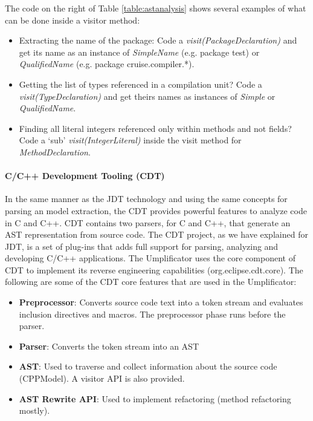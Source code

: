 The code on the right of Table \ref{table:astanalysis} shows several examples of what can be done inside a visitor method:

\begin{itemize}
\item Extracting the name of the package: Code a \textit{visit(PackageDeclaration)} and get its name as an instance of \textit{SimpleName} (e.g. package test)  or \textit{QualifiedName} (e.g. package cruise.compiler.*).
\item Getting the list of types referenced in a compilation unit? Code a \textit{visit(TypeDeclaration)} and get theirs names as instances of \textit{Simple} or \textit{QualifiedName}.
\item Finding all literal integers referenced only within methods and not fields? Code a `sub' \textit{visit(IntegerLiteral)} inside the visit method for \textit{MethodDeclaration}.
\end{itemize}

\paragraph*{C/C++ Development Tooling (CDT)}

In the same manner as the JDT technology and using the same concepts for parsing an model extraction, the CDT provides powerful features to analyze code in C and C++. CDT contains two parsers, for C and C++, that generate an AST representation from source code. The CDT project, as we have explained for JDT, is a set of plug-ins that adds full support for parsing, analyzing and developing C/C++ applications. The Umplificator uses the core component of CDT to implement its reverse engineering capabilities (org.eclipse.cdt.core). The following are some of the CDT core features that are used in the Umplificator:

\begin{itemize}
\item \textbf{Preprocessor}: Converts source code text into a token stream and evaluates inclusion directives and macros. The preprocessor phase runs before the parser. 
\item \textbf{Parser}: Converts the token stream into an AST
\item \textbf{AST}: Used to traverse and collect information about the source code (CPPModel). A visitor API is also provided. 
\item \textbf{AST Rewrite API}: Used to implement refactoring (method refactoring mostly).
\end{itemize}

